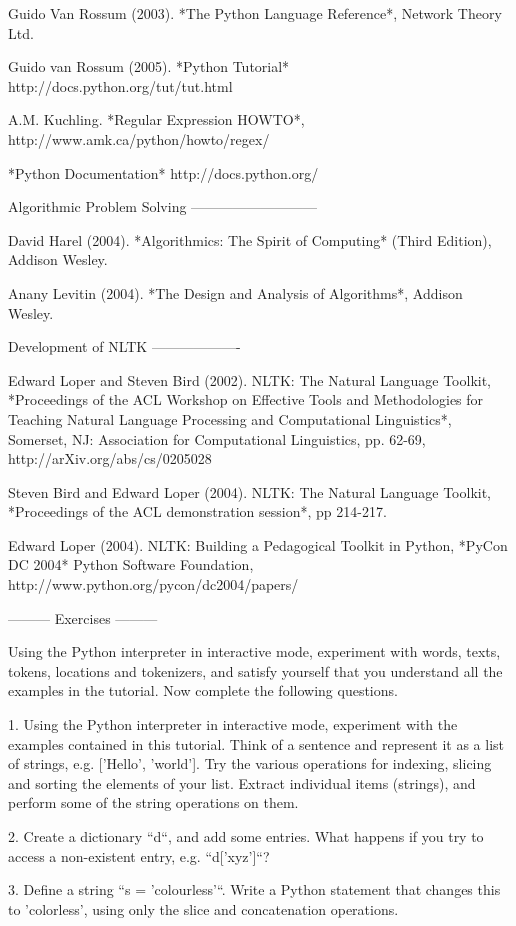 \documentclass[presentation]{beamer}
\begin{document}
Guido Van Rossum (2003).
*The Python Language Reference*,
Network Theory Ltd.

Guido van Rossum (2005).
*Python Tutorial*
http://docs.python.org/tut/tut.html

A.M. Kuchling.
*Regular Expression HOWTO*,
http://www.amk.ca/python/howto/regex/

*Python Documentation*
http://docs.python.org/

Algorithmic Problem Solving
---------------------------

David Harel (2004).
*Algorithmics: The Spirit of Computing* (Third Edition),
Addison Wesley.

Anany Levitin (2004).
*The Design and Analysis of Algorithms*,
Addison Wesley.

Development of NLTK
-------------------

Edward Loper and Steven Bird (2002).
NLTK: The Natural Language Toolkit,
*Proceedings of the ACL Workshop on Effective Tools and
Methodologies for Teaching Natural Language Processing and Computational
Linguistics*,
Somerset, NJ: Association for Computational Linguistics,
pp. 62-69, http://arXiv.org/abs/cs/0205028

Steven Bird and Edward Loper (2004).
NLTK: The Natural Language Toolkit,
*Proceedings of the ACL demonstration session*, pp 214-217.

Edward Loper (2004).
NLTK: Building a Pedagogical Toolkit in Python,
*PyCon DC 2004*
Python Software Foundation,
http://www.python.org/pycon/dc2004/papers/

---------
Exercises
---------

Using the Python interpreter in interactive mode, experiment with
words, texts, tokens, locations and tokenizers, and satisfy yourself
that you understand all the examples in the tutorial.  Now complete
the following questions.

1. Using the Python interpreter in interactive mode, experiment with
   the examples contained in this tutorial.  Think of a sentence and
   represent it as a list of strings, e.g. ['Hello', 'world'].
   Try the various operations for indexing, slicing and sorting the elements
   of your list.  Extract individual items (strings), and perform
   some of the string operations on them.

2. Create a dictionary ``d``, and add some entries.  What happens if
   you try to access a non-existent entry, e.g. ``d['xyz']``?

3. Define a string ``s = 'colourless'``.  Write a Python statement
   that changes this to 'colorless', using only the slice and
   concatenation operations.
\end{document}
